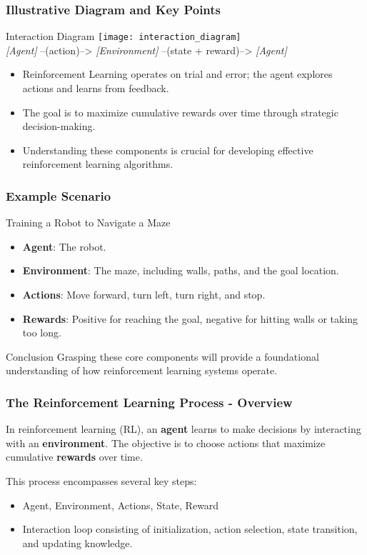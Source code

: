 \documentclass[aspectratio=169]{beamer}
\begin{document}
\begin{frame}[fragile]
  \frametitle{Illustrative Diagram and Key Points}
  \begin{block}{Interaction Diagram}
    \centering
    \texttt{[image: interaction\_diagram]} %
    \\
    \textit{[Agent]} --(action)--> \textit{[Environment]} --(state + reward)--> \textit{[Agent]}
  \end{block}
  
  \begin{itemize}
    \item Reinforcement Learning operates on trial and error; the agent explores actions and learns from feedback.
    \item The goal is to maximize cumulative rewards over time through strategic decision-making.
    \item Understanding these components is crucial for developing effective reinforcement learning algorithms.
  \end{itemize}
\end{frame}

\begin{frame}[fragile]
  \frametitle{Example Scenario}
  \begin{block}{Training a Robot to Navigate a Maze}
    \begin{itemize}
      \item \textbf{Agent}: The robot.
      \item \textbf{Environment}: The maze, including walls, paths, and the goal location.
      \item \textbf{Actions}: Move forward, turn left, turn right, and stop.
      \item \textbf{Rewards}: Positive for reaching the goal, negative for hitting walls or taking too long.
    \end{itemize}
  \end{block}
  \begin{block}{Conclusion}
    Grasping these core components will provide a foundational understanding of how reinforcement learning systems operate.
  \end{block}
\end{frame}

\begin{frame}[fragile]
    \frametitle{The Reinforcement Learning Process - Overview}
    In reinforcement learning (RL), an \textbf{agent} learns to make decisions by interacting with an \textbf{environment}. 
    The objective is to choose actions that maximize cumulative \textbf{rewards} over time. 

    This process encompasses several key steps:
    \begin{itemize}
        \item Agent, Environment, Actions, State, Reward
        \item Interaction loop consisting of initialization, action selection, state transition, and updating knowledge.
    \end{itemize}
\end{frame}
\end{document}
